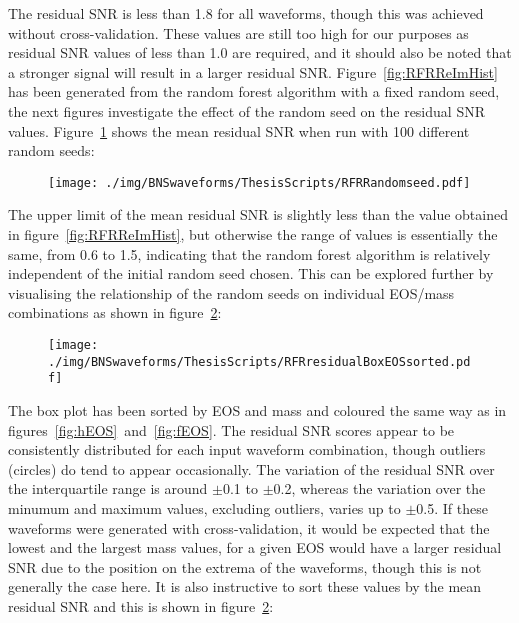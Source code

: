 The residual SNR is less than 1.8 for all waveforms, though this was achieved without cross-validation. These values are still too high for our purposes as residual SNR values of less than 1.0 are required, and it should also be noted that a stronger signal will result in a larger residual SNR. Figure~\ref{fig:RFRReImHist} has been generated from the random forest algorithm with a fixed random seed, the next figures investigate the effect of the random seed on the residual SNR values. Figure~\ref{fig:RFRRandomseed} shows the mean residual SNR when run with 100 different random seeds:
\begin{figure}[H]
	\centering
	\texttt{[image: ./img/BNSwaveforms/ThesisScripts/RFRRandomseed.pdf]} 
	\caption[\protect]{\protect}
	\label{fig:RFRRandomseed}
\end{figure}
The upper limit of the mean residual SNR is slightly less than the value obtained in figure~\ref{fig:RFRReImHist}, but otherwise the range of values is essentially the same, from 0.6 to 1.5, indicating that the random forest algorithm is relatively independent of the initial random seed chosen. This can be explored further by visualising the relationship of the random seeds on individual EOS/mass combinations as shown in figure~\ref{fig:RFRresidualBoxEOSsorted}: 
\begin{figure}[H]
	\centering
	\texttt{[image: ./img/BNSwaveforms/ThesisScripts/RFRresidualBoxEOSsorted.pdf]} 
	\caption[\protect]{\protect}
	\label{fig:RFRresidualBoxEOSsorted}
\end{figure}
The box plot has been sorted by EOS and mass and coloured the same way as in figures~\ref{fig:hEOS}~and~\ref{fig:fEOS}. The residual SNR scores appear to be consistently distributed for each input waveform combination, though outliers (circles) do tend to appear occasionally. The variation of the residual SNR over the interquartile range is around $\pm$0.1 to $\pm$0.2, whereas the variation over the minumum and maximum values, excluding outliers, varies up to $\pm$0.5. If these waveforms were generated with cross-validation, it would be expected that the lowest and the largest mass values, for a given EOS would have a larger residual SNR due to the position on the extrema of the waveforms, though this is not generally the case here. It is also instructive to sort these values by the mean residual SNR and this is shown in figure~\ref{fig:RFRresidualBoxEOSsorted}:
